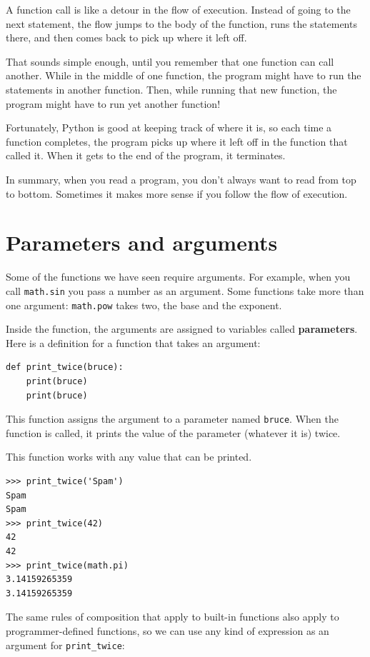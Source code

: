 \documentclass[10pt]{book}
\begin{document}
A function call is like a detour in the flow of execution. Instead of
going to the next statement, the flow jumps to the body of
the function, runs the statements there, and then comes back
to pick up where it left off.

That sounds simple enough, until you remember that one function can
call another.  While in the middle of one function, the program might
have to run the statements in another function.  Then, while
running that new function, the program might have to run yet
another function!

Fortunately, Python is good at keeping track of where it is, so each
time a function completes, the program picks up where it left off in
the function that called it.  When it gets to the end of the program,
it terminates.

In summary, when you read a program, you
don't always want to read from top to bottom.  Sometimes it makes
more sense if you follow the flow of execution.


\section{Parameters and arguments}
\label{parameters}

Some of the functions we have seen require arguments.  For
example, when you call {\tt math.sin} you pass a number
as an argument.  Some functions take more than one argument:
{\tt math.pow} takes two, the base and the exponent.

Inside the function, the arguments are assigned to
variables called {\bf parameters}.  Here is a definition for
a function that takes an argument:

\begin{verbatim}
def print_twice(bruce):
    print(bruce)
    print(bruce)
\end{verbatim}
%
This function assigns the argument to a parameter
named {\tt bruce}.  When the function is called, it prints the value of
the parameter (whatever it is) twice.

This function works with any value that can be printed.

\begin{verbatim}
>>> print_twice('Spam')
Spam
Spam
>>> print_twice(42)
42
42
>>> print_twice(math.pi)
3.14159265359
3.14159265359
\end{verbatim}
%
The same rules of composition that apply to built-in functions also
apply to programmer-defined functions, so we can use any kind of expression
as an argument for \verb"print_twice":
\end{document}
